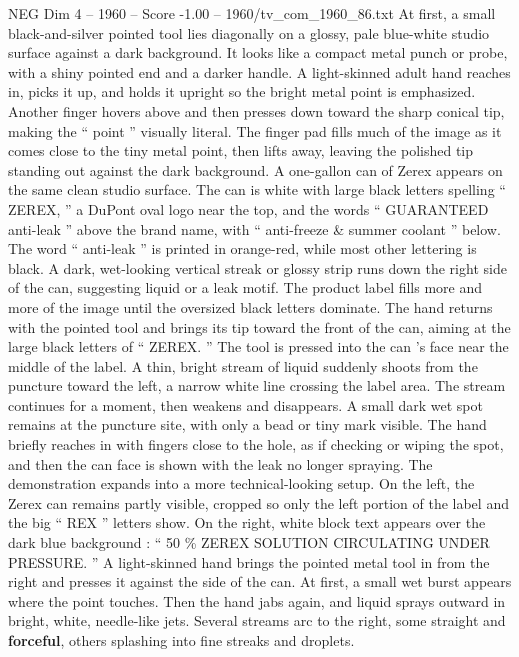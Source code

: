 \begin{textsample}{NEG Dim 4 – 1960 – Score -1.00 – 1960/tv\_com\_1960\_86.txt}  \label{ex:f4_neg_032}
At first, a small black-and-silver pointed tool lies diagonally on a glossy, pale blue-white studio surface against a dark background.
It looks like a compact metal punch or probe, with a shiny pointed end and a darker handle.
A light-skinned adult hand reaches in, picks it up, and holds it upright so the bright metal point is emphasized.
Another finger hovers above and then presses down toward the sharp conical tip, making the “ point ” visually literal.
The finger pad fills much of the image as it comes close to the tiny metal point, then lifts away, leaving the polished tip standing out against the dark background.
A one-gallon can of Zerex appears on the same clean studio surface.
The can is white with large black letters spelling “ ZEREX, ” a DuPont oval logo near the top, and the words “ GUARANTEED anti-leak ” above the brand name, with “ anti-freeze \& summer coolant ” below.
The word “ anti-leak ” is printed in orange-red, while most other lettering is black.
A dark, wet-looking vertical streak or glossy strip runs down the right side of the can, suggesting liquid or a leak motif.
The product label fills more and more of the image until the oversized black letters dominate.
The hand returns with the pointed tool and brings its tip toward the front of the can, aiming at the large black letters of “ ZEREX. ” The tool is pressed into the can ’s face near the middle of the label.
A thin, bright stream of liquid suddenly shoots from the puncture toward the left, a narrow white line crossing the label area.
The stream continues for a moment, then weakens and disappears.
A small dark wet spot remains at the puncture site, with only a bead or tiny mark visible.
The hand briefly reaches in with fingers close to the hole, as if checking or wiping the spot, and then the can face is shown with the leak no longer spraying.
The demonstration expands into a more technical-looking setup.
On the left, the Zerex can remains partly visible, cropped so only the left portion of the label and the big “ REX ” letters show.
On the right, white block text appears over the dark blue background : “ 50 \% ZEREX SOLUTION CIRCULATING UNDER PRESSURE. ” A light-skinned hand brings the pointed metal tool in from the right and presses it against the side of the can.
At first, a small wet burst appears where the point touches.
Then the hand jabs again, and liquid sprays outward in bright, white, needle-like jets.
Several streams arc to the right, some straight and \textbf{forceful}, others splashing into fine streaks and droplets.

\end{textsample}
